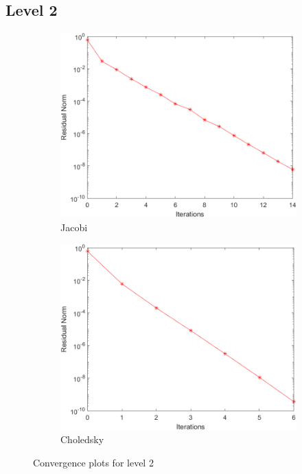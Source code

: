 \documentclass[a4paper, 11pt]{article}
\begin{document}
			\subsection*{Level 2}
				\begin{figure}[H]
					\begin{subfigure}{.49\textwidth}
						\centering
						\includegraphics[width=.99\linewidth]{img2/J.png}  
						\caption{Jacobi}
						\label{fig:Jacobi_2}
					\end{subfigure}
					\begin{subfigure}{.49\textwidth}
						\centering
						\includegraphics[width=.99\linewidth]{img2/C.png}  
						\caption{Choledsky}
						\label{fig:Chol_2}
					\end{subfigure}
					\caption{Convergence plots for level 2}
					\label{fig:fig2}
				\end{figure}
			
\end{document}
